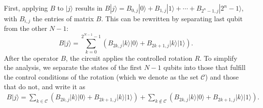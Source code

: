 \documentclass[10pt,letterpaper]{article} %
\begin{document}
First, applying $B$ to $|j\rangle$ results in $B|j\rangle = B_{0,j} |0\rangle + B_{1,j} |1 \rangle + \cdots + B_{2^n-1,j}|2^n-1\rangle$,
with $B_{i,j}$ the entries of matrix $B$.
This can be rewritten by separating last qubit from the other $N-1$:
\begin{equation}
B|j\rangle = \sum_{k=0}^{2^{N-1}-1} \left( B_{2k,j} |k\rangle|0\rangle  + B_{2k+1,j} |k \rangle |1\rangle  \right).
\end{equation}
After the operator $B$, the circuit applies the  controlled rotation $R$.
To simplify the analysis, we separate the states of
the first $N-1$ qubits into those that fulfill the control conditions of the rotation
(which we denote as the set $\mathcal{C}$)
and those that do not, and write it as
\begin{align}
B|j\rangle = 
   \sum_{k \in \mathcal{C}} \left( B_{2k,j} |k\rangle|0\rangle 
                                     + B_{2k+1,j} |k \rangle |1\rangle  \right) 
   + \sum_{k \not\in \mathcal{C}} \left( B_{2k,j} |k\rangle|0\rangle  
                                      + B_{2k+1,j} |k \rangle |1\rangle  \right).
\end{align}
\end{document}

